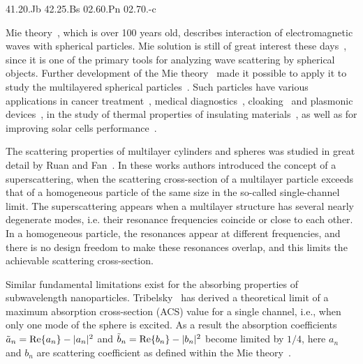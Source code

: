 \documentclass[aps,prl,twocolumn,showpacs,superscriptaddress,groupedaddress]{revtex4-1}
\begin{document}
\pacs%
{41.20.Jb 42.25.Bs 02.60.Pn 02.70.-c}

\maketitle %

Mie theory~\cite{Mie-1908}, which is over 100 years old, describes
interaction of electromagnetic waves with spherical particles. Mie
solution is still of great interest these
days~\cite{Suzuki-2008,MacKowski-2012,Lerme-2000,Xu-2005,Li-2006,Gogoi-2010,Santiago-2011},
since it is one of the primary tools for analyzing wave scattering by
spherical objects. Further development of the Mie
theory~\cite{Yang-2003, Pena-scattnlay-2009} made it possible to apply
it to study the multilayered spherical
particles~\cite{Sheehan-2013,Selmke-2012}.  Such particles have
various applications in cancer treatment~\cite{Zhang-2010,
  Hirsch-2003}, medical diagnostics~\cite{Allain-2002},
cloaking~\cite{Qui-2009, Semouchkina-2013, Ladutenko-2014} and
plasmonic devices~\cite{Martin-2013, Alu-2005}, in the study of
thermal properties of insulating materials~\cite{Xie-2013}, as well as
for improving solar cells performance~\cite{Kameya-2011,Mann-2011}.

The scattering properties of multilayer cylinders and spheres was
studied in great detail by Ruan and Fan~\cite{Fan-2010,Fan-2011}.  In
these works authors introduced the concept of a superscattering, when
the scattering cross-section of a multilayer particle exceeds that of
a homogeneous particle of the same size in the so-called
single-channel limit. The superscattering appears when a multilayer
structure has several nearly degenerate modes, i.e. their resonance
frequencies coincide or close to each other. In a homogeneous
particle, the resonances appear at different frequencies, and there is
no design freedom to make these resonances overlap, and this limits
the achievable scattering cross-section.

Similar fundamental limitations exist for the absorbing properties of
subwavelength nanoparticles.  Tribelsky~\cite{Tribelsky-2011} has
derived a theoretical limit of a maximum absorption cross-section
(ACS) value for a single channel, i.e., when only one mode of the
sphere is excited.  As a result the absorption coefficients
$\tilde{a}_n= {\rm Re}\{a_n\} - |a_n|^2 $ and $\tilde{b}_n= {\rm
  Re}\{b_n\} - |b_n|^2 $ become limited by $1/4$, here $a_n$ and $b_n$
are scattering coefficient as defined within the Mie
theory~\cite{Bohren-1983}.
\end{document}
